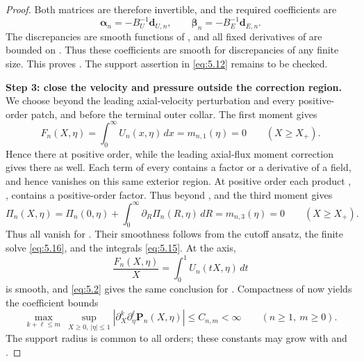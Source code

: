 \begin{proof}
Both matrices are therefore invertible, and the required coefficients are
\begin{equation}\label{eq:5.16}
\boldsymbol\alpha_n=-B_U^{-1}\mathbf d_{U,n},
\qquad
\boldsymbol\beta_n=-B_E^{-1}\mathbf d_{E,n}.
\tag{5.16}
\end{equation}
The discrepancies are smooth functions of , and all fixed derivatives of
 are bounded on . Thus these coefficients are smooth for discrepancies of
any finite size. This proves . The support assertion in \eqref{eq:5.12} remains to be checked.

\textbf{Step 3: close the velocity and pressure outside the correction region.}
We choose  beyond the leading axial-velocity perturbation  and every
positive-order patch, and before the terminal outer collar. The first moment gives
\[
F_n(X,\eta)=\int_0^\infty U_n(x,\eta)\,dx=m_{n,1}(\eta)=0
\qquad (X\geq X_+).
\]
Hence  there at positive order, while the leading axial-flux moment correction
gives  there as well. Each term of every  contains a
 factor or a derivative of a  field, and hence vanishes on this same exterior
region. At positive order each product , , contains a
positive-order factor. Thus  beyond , and the third moment gives
\[
\Pi_n(X,\eta)
=\Pi_n(0,\eta)+\int_0^\infty\partial_R\Pi_n(R,\eta)\,dR
=m_{n,3}(\eta)=0
\qquad (X\geq X_+).
\]
Thus  all vanish for . Their smoothness follows
from the cutoff ansatz, the finite solve \eqref{eq:5.16}, and the integrals \eqref{eq:5.15}. At the axis,
\[
\frac{F_n(X,\eta)}{X}=\int_0^1U_n(tX,\eta)\,dt
\]
is smooth, and \eqref{eq:5.2} gives the same conclusion for . Compactness of
 now yields the coefficient bounds
\begin{equation}\label{eq:5.17}
\max_{k+\ell\leq m}\ \sup_{X\geq0,\,|\eta|\leq1}
|\partial_X^k\partial_\eta^\ell\mathbf P_n(X,\eta)|
\leq C_{n,m}<\infty
\qquad(n\geq1,\ m\geq0).
\tag{5.17}
\end{equation}
The support radius is common to all orders; these constants may grow with  and
.


\end{proof}
